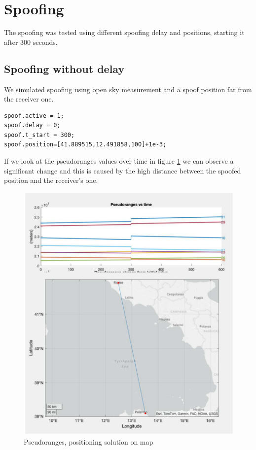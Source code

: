 \section{Spoofing}
\label{sec:spoofing}
The spoofing was tested using different spoofing delay and positions, starting it after 300 seconds.
\subsection{Spoofing without delay}
\label{spoofing_without_delay}
We simulated spoofing using open sky measurement and a spoof position far from the receiver one.
\begin{lstlisting}
spoof.active = 1; 
spoof.delay = 0; 
spoof.t_start = 300; 
spoof.position=[41.889515,12.491858,100]+1e-3; 
\end{lstlisting} 
If we look at the pseudoranges values over time in figure \ref{fig:delay0_far} we can observe a significant change and this is caused by the high distance between the spoofed position and the receiver's one.

\begin{figure}[!htb]
\includegraphics[scale=0.21]{images/delay0_far_figure_1_4.pdf}
\caption{Pseudoranges, positioning solution on map}
\label{fig:delay0_far}
\end{figure}


